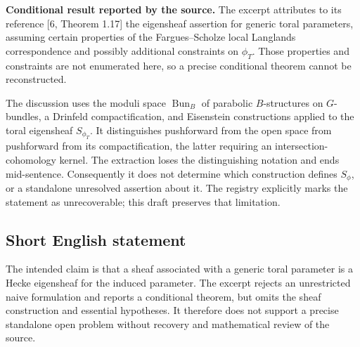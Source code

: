 \documentclass[11pt]{article}
\begin{document}
\textbf{Conditional result reported by the source.} The excerpt attributes to its reference [6, Theorem 1.17] the eigensheaf assertion for generic toral parameters, assuming certain properties of the Fargues--Scholze local Langlands correspondence and possibly additional constraints on \(\phi_T\). Those properties and constraints are not enumerated here, so a precise conditional theorem cannot be reconstructed.

The discussion uses the moduli space \(\operatorname{Bun}_B\) of parabolic \(B\)-structures on \(G\)-bundles, a Drinfeld compactification, and Eisenstein constructions applied to the toral eigensheaf \(S_{\phi_T}\). It distinguishes pushforward from the open space from pushforward from its compactification, the latter requiring an intersection-cohomology kernel. The extraction loses the distinguishing notation and ends mid-sentence. Consequently it does not determine which construction defines \(S_\phi\), or a standalone unresolved assertion about it. The registry explicitly marks the statement as unrecoverable; this draft preserves that limitation.
\subsection{Short English statement}
The intended claim is that a sheaf associated with a generic toral parameter is a Hecke eigensheaf for the induced parameter. The excerpt rejects an unrestricted naive formulation and reports a conditional theorem, but omits the sheaf construction and essential hypotheses. It therefore does not support a precise standalone open problem without recovery and mathematical review of the source.
\end{document}
